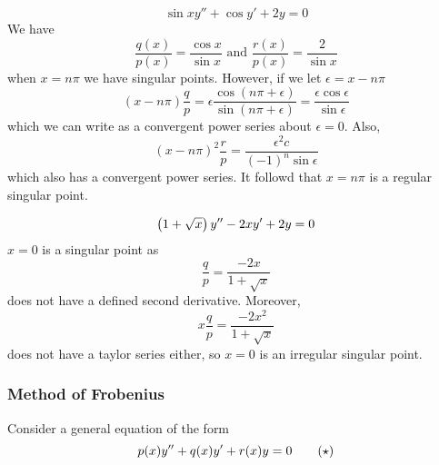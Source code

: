 \documentclass{article}
\begin{document}
\begin{eg}
    \[
        \sin x y'' + \cos y' + 2y = 0
    \]
    We have
    \[
        \frac{q(x)}{p(x)} = \frac{\cos x}{\sin x} \text{ and } \frac{r(x)}{p(x)} = \frac{2}{\sin x}
    \]
    when $x = n \pi$ we have singular points. However, if we let $\epsilon = x - n\pi$
    \[
        (x - n \pi) \frac{q}{p} = \epsilon \frac{\cos(n\pi + \epsilon)}{\sin(n\pi + \epsilon)} = \frac{\epsilon \cos \epsilon}{\sin \epsilon}
    \]
    which we can write as a convergent power series about $\epsilon = 0$. Also,
    \[
        (x - n \pi)^2 \frac{r}{p} = \frac{\epsilon^2 c}{(-1)^n \sin \epsilon}
    \]
    which also has a convergent power series.
    It followd that $x = n \pi$ is a regular singular point.
\end{eg}

\begin{eg}
    \[
        \left( 1 + \sqrt{x} \right) y'' - 2x y' + 2y = 0  
    \]
    $x = 0$ is a singular point as
    \[
        \frac{q}{p} = \frac{-2x}{1 + \sqrt{x}}  
    \]
    does not have a defined second derivative. 
    Moreover, 
    \[
        x\frac{q}{p} = \frac{-2x^2}{1 + \sqrt{x}}
    \]
    does not have a taylor series either, so $x = 0$ is an irregular singular point.
\end{eg}

\subsubsection{Method of Frobenius}
Consider a general equation of the form
\[
    p(x)y'' + q(x)y' + r(x) y = 0 \tagstar
\]
\end{document}
